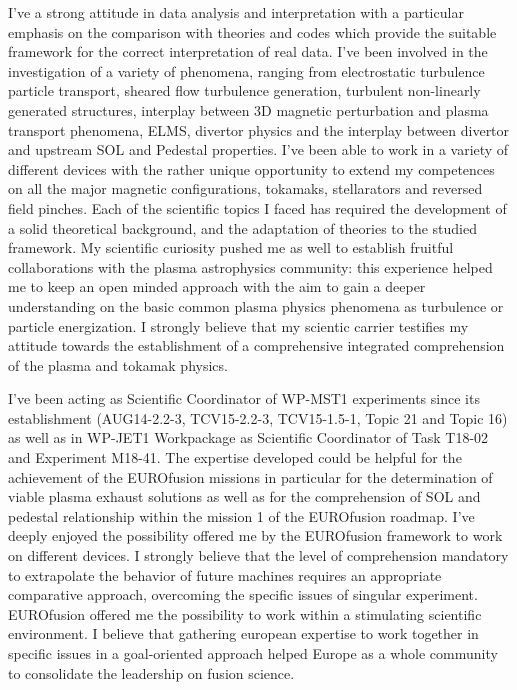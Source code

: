 \documentclass[12pt,a4paper,sans]{moderncv}        %
\begin{document}
I've a strong attitude in
data analysis and interpretation with a particular emphasis on the
comparison with theories and codes which provide the suitable framework for the
correct interpretation of real data. I've been involved in
the investigation of a variety of phenomena, ranging from electrostatic
turbulence particle transport, sheared flow turbulence generation,
turbulent non-linearly generated structures, interplay between 3D
magnetic perturbation and plasma transport phenomena, ELMS, divertor
physics and the interplay between divertor and upstream SOL and
Pedestal properties. I've been able to work in a variety of different
devices with the rather unique opportunity to extend my competences
on all the major magnetic configurations, tokamaks,  stellarators and
reversed field pinches. Each of the scientific 
topics I faced has required the development of a solid theoretical
background, and the adaptation of theories to the studied
framework. My scientific curiosity pushed me as well to establish
fruitful collaborations with the plasma astrophysics community: this
experience helped me to keep an open minded approach with the aim to
gain a deeper understanding on the basic common plasma physics
phenomena as turbulence or particle energization. 
I strongly believe that my scientic carrier testifies my 
attitude towards the
establishment of a comprehensive integrated comprehension of
the plasma and tokamak physics. 

I've been acting as Scientific Coordinator of WP-MST1 experiments since
its establishment (AUG14-2.2-3, TCV15-2.2-3, TCV15-1.5-1, Topic 21 and
Topic 16) as well as in WP-JET1 Workpackage as Scientific Coordinator
of Task T18-02 and Experiment M18-41. The expertise developed could be
helpful for the achievement of the EUROfusion missions in particular
for the determination of viable plasma exhaust solutions as well as
for the comprehension of SOL and pedestal relationship within the
mission 1 of the EUROfusion roadmap. 
I've deeply enjoyed the
possibility offered me by the EUROfusion framework to work on
different devices. I strongly believe that the level of
comprehension mandatory to extrapolate the behavior of future
machines requires an appropriate comparative approach, overcoming the
specific issues of singular experiment.
EUROfusion offered me the possibility to work within a stimulating
scientific environment. I believe that gathering
european expertise to work together in specific issues in a
goal-oriented approach helped Europe as a whole community to
consolidate the leadership on fusion science.
\end{document}
